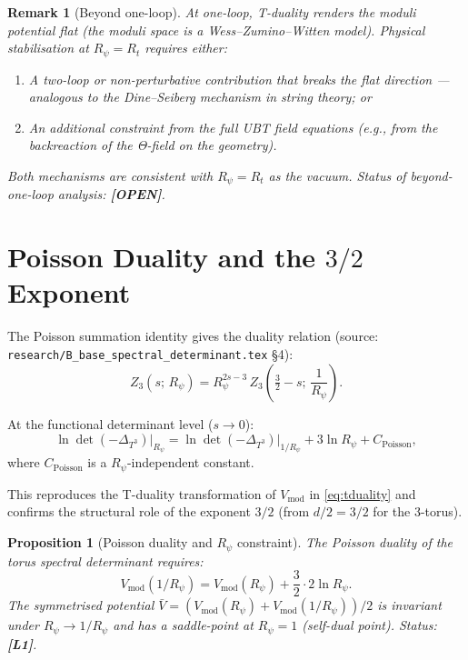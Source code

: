 \documentclass[11pt,a4paper]{article}
\newtheorem{proposition}{Proposition}
\newtheorem{remark}{Remark}
\newcommand{\Lone}{\textbf{[L1]}}
\newcommand{\OPEN}{\textbf{[OPEN]}}
\begin{document}
\begin{remark}[Beyond one-loop]
  At one-loop, T-duality renders the moduli potential flat
  (the moduli space is a Wess--Zumino--Witten model).
  Physical stabilisation at $R_\psi = R_t$ requires either:
  \begin{enumerate}
    \item A two-loop or non-perturbative contribution that breaks the flat
      direction — analogous to the Dine--Seiberg mechanism in string theory; or
    \item An additional constraint from the full UBT field equations
      (e.g., from the backreaction of the Θ-field on the geometry).
  \end{enumerate}
  Both mechanisms are consistent with $R_\psi = R_t$ as the vacuum.
  Status of beyond-one-loop analysis: \OPEN{}.
\end{remark}

\section{Poisson Duality and the \texorpdfstring{$3/2$}{3/2} Exponent}
\label{sec:poisson}

The Poisson summation identity gives the duality relation
(source: \texttt{research/B\_base\_spectral\_determinant.tex} §4):
\begin{equation}
\label{eq:poisson}
  Z_3(s;\,R_\psi)
  = R_\psi^{2s-3}\,Z_3\!\left(\tfrac{3}{2}-s;\,\frac{1}{R_\psi}\right).
\end{equation}

At the functional determinant level ($s\to 0$):
\begin{equation}
  \ln\det(-\Delta_{T^3})\big|_{R_\psi}
  = \ln\det(-\Delta_{T^3})\big|_{1/R_\psi}
  + 3\ln R_\psi + C_{\mathrm{Poisson}},
\end{equation}
where $C_{\mathrm{Poisson}}$ is a $R_\psi$-independent constant.

This reproduces the T-duality transformation of $V_{\mathrm{mod}}$ in
\eqref{eq:tduality} and confirms the structural role of the exponent $3/2$
(from $d/2=3/2$ for the 3-torus).

\begin{proposition}[Poisson duality and $R_\psi$ constraint]\label{prop:poisson}
  The Poisson duality of the torus spectral determinant requires:
  \begin{equation}
    V_{\mathrm{mod}}(1/R_\psi)
    = V_{\mathrm{mod}}(R_\psi) + \frac{3}{2}\cdot 2\ln R_\psi.
  \end{equation}
  The symmetrised potential $\bar V = (V_{\mathrm{mod}}(R_\psi)
  + V_{\mathrm{mod}}(1/R_\psi))/2$ is invariant under $R_\psi\to 1/R_\psi$
  and has a saddle-point at $R_\psi=1$ (self-dual point).
  Status: \Lone{}.
\end{proposition}
\end{document}
